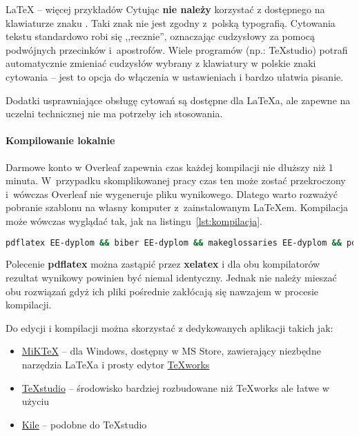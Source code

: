 \begin{easyappendix}{\LaTeX{} -- więcej przykładów}
Cytując \textbf{nie należy} korzystać z dostępnego na klawiaturze znaku . Taki znak nie jest zgodny z~polską typografią. Cytowania tekstu standardowo robi się ,,recznie'', oznaczając cudzysłowy za pomocą podwójnych przecinków i~apostrofów. Wiele programów (np.: TeXstudio) potrafi automatycznie zmieniać cudzysłów wybrany z klawiatury w polskie znaki cytowania -- jest to opcja do włączenia w ustawieniach i bardzo ułatwia pisanie.

Dodatki usprawniające obsługę cytowań są dostępne dla \LaTeX{a}, ale zapewne na uczelni technicznej nie ma potrzeby ich stosowania.

\paragraph{Kompilowanie lokalnie}
Darmowe konto w Overleaf zapewnia czas każdej kompilacji nie dłuższy niż 1 minuta. W~przypadku skomplikowanej pracy czas ten może zostać przekroczony i~wówczas Overleaf nie wygeneruje pliku wynikowego. Dlatego warto rozważyć pobranie szablonu na własny komputer z~zainstalowanym \LaTeX{em}. Kompilacja może wówczas wyglądać tak, jak na listingu~\ref{lst:kompilacja}.

\begin{lstlisting}[language=bash,
	caption={Kompilacja pracy dyplomowej lokalnie},
	label={lst:kompilacja}]
	pdflatex EE-dyplom && biber EE-dyplom && makeglossaries EE-dyplom && pdflatex EE-dyplom && pdflatex EE-dyplom
\end{lstlisting}

Polecenie \textbf{pdflatex} można zastąpić przez \textbf{xelatex} i dla obu kompilatorów rezultat wynikowy powinien być niemal identyczny. Jednak nie należy mieszać obu rozwiązań gdyż ich pliki pośrednie zakłócają się nawzajem w procesie kompilacji.

Do edycji i kompilacji można skorzystać z dedykowanych aplikacji takich jak:
\begin{itemize}
	\item \href{https://miktex.org/}{MiKTeX} -- dla Windows, dostępny w MS Store, zawierający niezbędne narzędzia \LaTeX{a} i prosty edytor \href{https://www.tug.org/texworks/}{TeXworks}
	\item \href{https://www.texstudio.org/}{TeXstudio} -- środowisko bardziej rozbudowane niż TeXworks ale łatwe w użyciu
	\item \href{https://kile.sourceforge.io/}{Kile} -- podobne do TeXstudio
\end{itemize}


\end{easyappendix}

